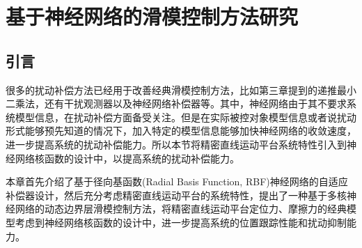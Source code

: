 \chapter{基于神经网络的滑模控制方法研究}
\section{引言}很多的扰动补偿方法已经用于改善经典滑模控制方法，比如第三章提到的递推最小二乘法，还有干扰观测器以及神经网络补偿器等。其中，神经网络由于其不要求系统模型信息，在扰动补偿方面备受关注。但是在实际被控对象模型信息或者说扰动形式能够预先知道的情况下，加入特定的模型信息能够加快神经网络的收敛速度，进一步提高系统的扰动补偿能力。所以本节将精密直线运动平台系统特性引入到神经网络核函数的设计中，以提高系统的扰动补偿能力。

本章首先介绍了基于径向基函数(Radial Basis Function, RBF)神经网络的自适应补偿器设计，然后充分考虑精密直线运动平台的系统特性，提出了一种基于多核神经网络的动态边界层滑模控制方法，将精密直线运动平台定位力、摩擦力的经典模型考虑到神经网络核函数的设计中，进一步提高系统的位置跟踪性能和扰动抑制能力。

